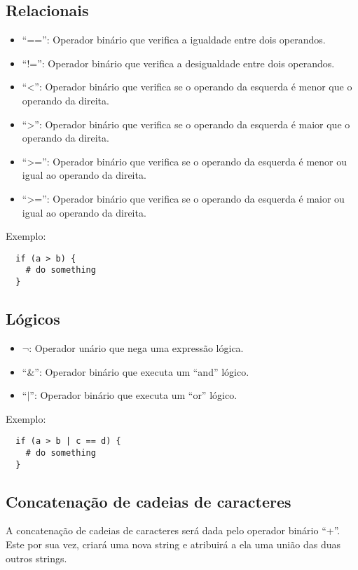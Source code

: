 \documentclass[a4paper, 11pt, article]{memoir}
\begin{document}
\subsection{Relacionais}
\label{subsec:relacionais}
\begin{itemize}
\item ``=='': Operador binário que verifica a igualdade entre dois operandos.
\item ``!='': Operador binário que verifica a desigualdade entre dois operandos.
\item ``\textless'': Operador binário que verifica se o operando da esquerda é
  menor que o operando da direita.
\item ``\textgreater'': Operador binário que verifica se o operando da esquerda
  é maior que o operando da direita.
\item ``\textgreater='': Operador binário que verifica se o operando da esquerda
  é menor ou igual ao operando da direita.
\item ``\textgreater='': Operador binário que verifica se o operando da esquerda
  é maior ou igual ao operando da direita.
\end{itemize}

Exemplo:
\begin{lstlisting}
  if (a > b) {
    # do something
  }
\end{lstlisting}

\subsection{Lógicos}
\label{subsec:logicos}
\begin{itemize}
\item $\lnot$: Operador unário que nega uma expressão lógica.
\item ``\&'': Operador binário que executa um ``and'' lógico.
\item ``$|$'': Operador binário que executa um ``or'' lógico.
\end{itemize}

Exemplo:
\begin{lstlisting}
  if (a > b | c == d) {
    # do something
  }
\end{lstlisting}

\subsection{Concatenação de cadeias de caracteres}
\label{subsec:concatenacao}
A concatenação de cadeias de caracteres será dada pelo operador binário ``+''.
Este por sua vez, criará uma nova string e atribuirá a ela uma união das duas
outros strings.
\end{document}
